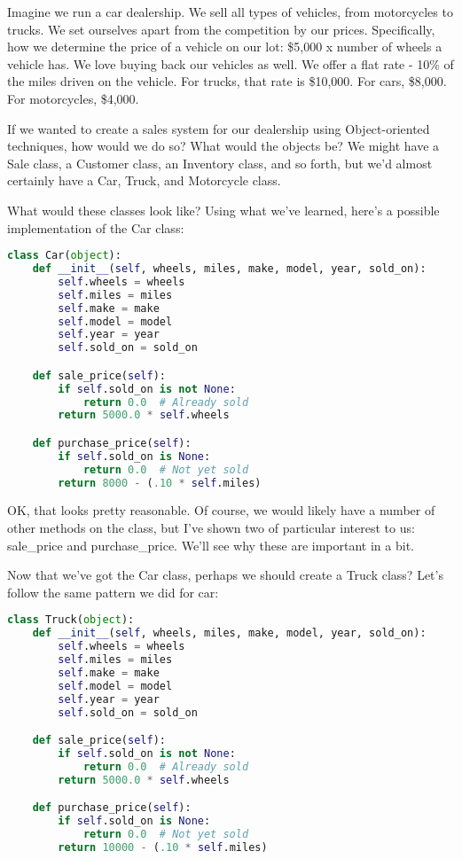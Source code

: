 Imagine we run a car dealership. We sell all types of vehicles, from motorcycles to trucks. We set ourselves apart from the competition by our prices. Specifically, how we determine the price of a vehicle on our lot: \$5,000 x number of wheels a vehicle has. We love buying back our vehicles as well. We offer a flat rate - 10\% of the miles driven on the vehicle. For trucks, that rate is \$10,000. For cars, \$8,000. For motorcycles, \$4,000.

If we wanted to create a sales system for our dealership using Object-oriented techniques, how would we do so? What would the objects be? We might have a Sale class, a Customer class, an Inventory class, and so forth, but we'd almost certainly have a Car, Truck, and Motorcycle class.

What would these classes look like? Using what we've learned, here's a possible implementation of the Car class:

\begin{lstlisting}[language=Python]
class Car(object):
    def __init__(self, wheels, miles, make, model, year, sold_on):
        self.wheels = wheels
        self.miles = miles
        self.make = make
        self.model = model
        self.year = year
        self.sold_on = sold_on

    def sale_price(self):
        if self.sold_on is not None:
            return 0.0  # Already sold
        return 5000.0 * self.wheels

    def purchase_price(self):
        if self.sold_on is None:
            return 0.0  # Not yet sold
        return 8000 - (.10 * self.miles)
\end{lstlisting}

OK, that looks pretty reasonable. Of course, we would likely have a number of other methods on the class, but I've shown two of particular interest to us: sale_price and purchase_price. We'll see why these are important in a bit.

Now that we've got the Car class, perhaps we should create a Truck class? Let's follow the same pattern we did for car:

\begin{lstlisting}[language=Python]
class Truck(object):
    def __init__(self, wheels, miles, make, model, year, sold_on):
        self.wheels = wheels
        self.miles = miles
        self.make = make
        self.model = model
        self.year = year
        self.sold_on = sold_on

    def sale_price(self):
        if self.sold_on is not None:
            return 0.0  # Already sold
        return 5000.0 * self.wheels

    def purchase_price(self):
        if self.sold_on is None:
            return 0.0  # Not yet sold
        return 10000 - (.10 * self.miles)
\end{lstlisting}

